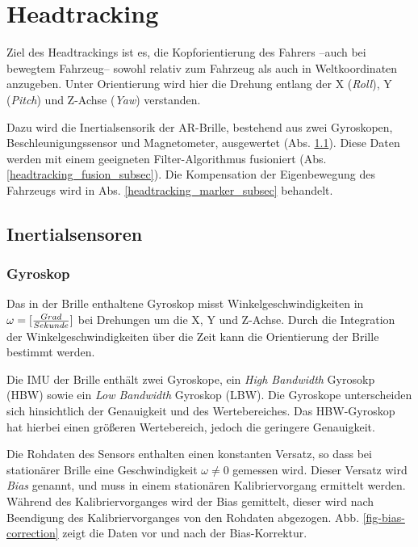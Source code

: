 
\section{Headtracking}

Ziel des Headtrackings ist es, die Kopforientierung des Fahrers --auch bei bewegtem  Fahrzeug-- sowohl relativ zum Fahrzeug als auch in Weltkoordinaten anzugeben. Unter Orientierung wird hier die Drehung entlang der X (\emph{Roll}), Y (\emph{Pitch}) und Z-Achse (\emph{Yaw}) verstanden.

Dazu wird die Inertialsensorik der \ac{AR}-Brille, bestehend aus zwei Gyroskopen, Beschleunigungssensor und Magnetometer, ausgewertet (Abs. \ref{headtracking_imu_subsec}).
Diese Daten werden mit einem geeigneten Filter-Algorithmus fusioniert (Abs. \ref{headtracking_fusion_subsec}).
Die Kompensation der Eigenbewegung des Fahrzeugs wird in Abs. \ref{headtracking_marker_subsec} behandelt.


\subsection{Inertialsensoren}
\label{headtracking_imu_subsec}


\subsubsection{Gyroskop}

Das in der Brille enthaltene Gyroskop misst Winkelgeschwindigkeiten in
$\omega = [{Grad \over Sekunde}]$ bei Drehungen um die X, Y und Z-Achse. Durch
die Integration der Winkelgeschwindigkeiten über die Zeit kann die
Orientierung der Brille bestimmt werden.  

Die IMU der Brille enthält zwei
Gyroskope, ein \emph{High Bandwidth} Gyrosokp (HBW) sowie ein
\emph{Low Bandwidth} Gyroskop (LBW). Die Gyroskope unterscheiden sich
hinsichtlich der Genauigkeit und des Wertebereiches. Das HBW-Gyroskop
hat hierbei einen größeren Wertebereich, jedoch die geringere
Genauigkeit.

Die Rohdaten des Sensors enthalten einen konstanten Versatz, so dass bei
stationärer Brille eine Geschwindigkeit $\omega \neq 0$ gemessen wird. Dieser
Versatz wird \emph{Bias} genannt, und muss in einem stationären
Kalibriervorgang ermittelt werden. Während des Kalibriervorganges wird
der Bias gemittelt, dieser wird nach Beendigung des Kalibriervorganges von den
Rohdaten abgezogen. Abb. \ref{fig-bias-correction} zeigt die Daten vor und nach der
Bias-Korrektur.

